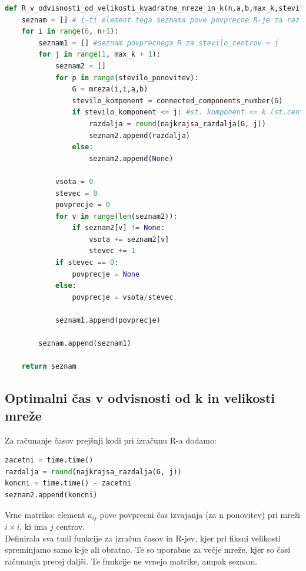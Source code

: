 \documentclass[a4paper]{article}
\begin{document}
\begin{lstlisting}[language=Python]
def R_v_odvisnosti_od_velikosti_kvadratne_mreze_in_k(n,a,b,max_k,stevilo_ponovitev):
    seznam = [] # i-ti element tega seznama pove povprecne R-je za razlicne k-je za ixi matriko
    for i in range(6, n+1):
        seznam1 = [] #seznam povprecnega R za stevilo_centrov = j
        for j in range(1, max_k + 1):
            seznam2 = []
            for p in range(stevilo_ponovitev):
                G = mreza(i,i,a,b)
                stevilo_komponent = connected_components_number(G)
                if stevilo_komponent <= j: #st. komponent <= k (st.centrov) (j)
                    razdalja = round(najkrajsa_razdalja(G, j))
                    seznam2.append(razdalja)
                else:
                    seznam2.append(None)

            vsota = 0
            stevec = 0
            povprecje = 0
            for v in range(len(seznam2)):
                if seznam2[v] != None:
                    vsota += seznam2[v]
                    stevec += 1
            if stevec == 0:
                povprecje = None
            else:
                povprecje = vsota/stevec

            seznam1.append(povprecje)

        seznam.append(seznam1)

    return seznam
\end{lstlisting}

\subsection{Optimalni čas v odvisnosti od k in velikosti mreže}
Za računanje časov prejšnji kodi pri izračunu R-a dodamo:
\begin{lstlisting}[language=Python]
zacetni = time.time()
razdalja = round(najkrajsa_razdalja(G, j))
koncni = time.time() - zacetni
seznam2.append(koncni)
\end{lstlisting}

Vrne matriko: element $a_{ij}$ pove povprecni čas izvajanja (za n ponovitev) pri mreži $i\times i$, ki ima $j$ centrov.\\

Definirala sva tudi funkcije za izračun časov in R-jev, kjer pri fiksni velikosti spreminjamo samo k-je ali obratno. Te so uporabne za večje mreže, kjer so časi računanja precej daljši. Te funkcije ne vrnejo matrike, ampak seznam.

\end{document}
